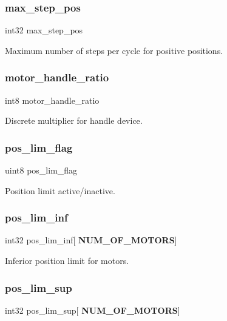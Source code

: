 \subsubsection{max\+\_\+step\+\_\+pos}
{\footnotesize\ttfamily int32 max\+\_\+step\+\_\+pos}

Maximum number of steps per cycle for positive positions. \mbox{\label{structst__mem_a098badbb74d31ea6257e57f6d66823cc}} 
\subsubsection{motor\+\_\+handle\+\_\+ratio}
{\footnotesize\ttfamily int8 motor\+\_\+handle\+\_\+ratio}

Discrete multiplier for handle device. \mbox{\label{structst__mem_aa2ceebf7546e978c8b0393ce8035532d}} 
\subsubsection{pos\+\_\+lim\+\_\+flag}
{\footnotesize\ttfamily uint8 pos\+\_\+lim\+\_\+flag}

Position limit active/inactive. \mbox{\label{structst__mem_a631265c712a620e03d9233634e1819a2}} 
\subsubsection{pos\+\_\+lim\+\_\+inf}
{\footnotesize\ttfamily int32 pos\+\_\+lim\+\_\+inf[\textbf{ N\+U\+M\+\_\+\+O\+F\+\_\+\+M\+O\+T\+O\+RS}]}

Inferior position limit for motors. \mbox{\label{structst__mem_a818808d7c324999701b5aad40a8fabca}} 
\subsubsection{pos\+\_\+lim\+\_\+sup}
{\footnotesize\ttfamily int32 pos\+\_\+lim\+\_\+sup[\textbf{ N\+U\+M\+\_\+\+O\+F\+\_\+\+M\+O\+T\+O\+RS}]}

